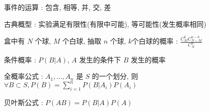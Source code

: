 \documentclass[UTF8, 12pt]{ctexart}
\begin{document}
	
	事件的运算 : 包含, 相等, 并, 交, 差

	古典概型 : 实验满足有限性(有限中可能), 等可能性(发生概率相同)

	盒中有 $ N $ 个球, $ M $ 个白球, 抽取 $ n $ 个球, $ k $个白球的概率 : $ \frac{C_{M}^{k}C_{N-M}^{n-k}}{C_{N}^{n}} $

	条件概率 : $ P(B|A) $, $ A $ 发生的条件下 $ B $ 发生的概率

	全概率公式 : $ A_{1}, \dots, A_{n} $ 是 $ S $ 的一个划分, 则 $ \forall B \subset S, P(B) = \sum\limits_{i=1}^{n}P(B|A_{i})P(A_{i}) $

	贝叶斯公式 : $ P(AB) = P(B|A)P(A) $
\end{document}
